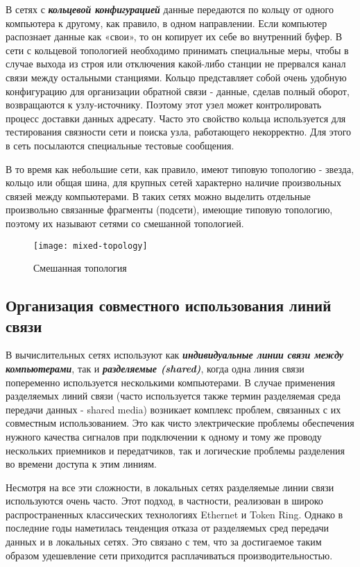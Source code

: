 В сетях с \textbf{\textit{кольцевой конфигурацией}} данные передаются по кольцу от одного компьютера к другому, как правило, в одном направлении.
Если компьютер распознает данные как «свои», то он копирует их себе во внутренний буфер.
В сети с кольцевой топологией необходимо принимать специальные меры, чтобы в случае выхода из строя или отключения какой-либо станции не прервался канал связи между остальными станциями.
Кольцо представляет собой очень удобную конфигурацию для организации обратной связи - данные, сделав полный оборот, возвращаются к узлу-источнику.
Поэтому этот узел может контролировать процесс доставки данных адресату.
Часто это свойство кольца используется для тестирования связности сети и поиска узла, работающего некорректно.
Для этого в сеть посылаются специальные тестовые сообщения.

В то время как небольшие сети, как правило, имеют типовую топологию - звезда, кольцо или общая шина, для крупных сетей характерно наличие произвольных связей между компьютерами.
В таких сетях можно выделить отдельные произвольно связанные фрагменты (подсети), имеющие типовую топологию, поэтому их называют сетями со смешанной топологией.

\begin{figure}[!ht]
    \centering
    \texttt{[image: mixed-topology]}
    \caption{Смешанная топология}
    \label{fig:mixed-topology}
\end{figure}

\subsection{Организация совместного использования линий связи}

В вычислительных сетях используют как \textbf{\textit{индивидуальные линии связи между компьютерами}}, так и \textbf{\textit{разделяемые (shared)}}, когда одна линия связи попеременно используется несколькими компьютерами.
В случае применения разделяемых линий связи (часто используется также термин разделяемая среда передачи данных - shared media) возникает комплекс проблем, связанных с их совместным использованием.
Это как чисто электрические проблемы обеспечения нужного качества сигналов при подключении к одному и тому же проводу нескольких приемников и передатчиков, так и логические проблемы разделения во времени доступа к этим линиям.

Несмотря на все эти сложности, в локальных сетях разделяемые линии связи используются очень часто.
Этот подход, в частности, реализован в широко распространенных классических технологиях Ethernet и Token Ring.
Однако в последние годы наметилась тенденция отказа от разделяемых сред передачи данных и в локальных сетях.
Это связано с тем, что за достигаемое таким образом удешевление сети приходится расплачиваться производительностью.

